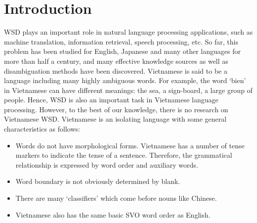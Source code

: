 \documentclass[english]{jnlp_1.4}
\begin{document}
\maketitle

\section{Introduction} \label{section:introduction}
WSD plays an important role in natural language processing applications, such as machine translation, information retrieval, speech processing, etc.
So far, this problem has been studied for English, Japanese and many other languages for more than half a century,
and many effective knowledge sources as well as disambiguation methods have been discovered.
Vietnamese is said to be a language including many highly ambiguous words.
For example, the word `bien' in Vietnamese can have different meanings: the sea, a sign-board, a large group of people. 
Hence, WSD is also an important task in Vietnamese language processing. 
However, to the best of our knowledge, there is no research on Vietnamese WSD.
Vietnamese is an isolating language with some general characteristics as follows:
\begin{itemize}
\item Words do not have morphological forms.
Vietnamese has a number of tense markers to indicate the tense of a sentence.
 Therefore, the grammatical relationship is expressed by word order and auxiliary words.
\item Word boundary is not obviously determined by blank.
\item There are many `classifiers' which come before nouns like Chinese.
\item Vietnamese also has the same basic SVO word order as English.
\end{itemize}
\end{document}
